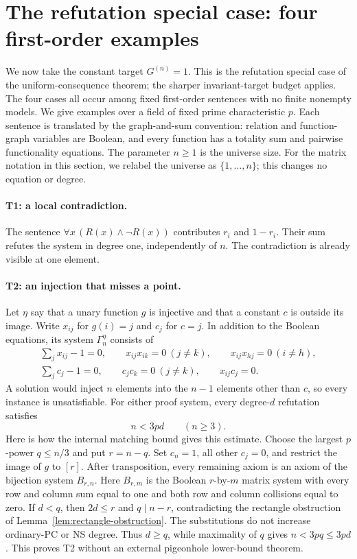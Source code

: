 \section{The refutation special case: four first-order examples}
\label{sec:examples}

We now take the constant target $G^{(n)}=1$. This is the refutation special
case of the uniform-consequence theorem; the sharper invariant-target
budget applies. The four cases all occur among fixed first-order sentences with no finite
nonempty models. We give examples over a field of fixed prime characteristic
$p$. Each sentence is translated by the graph-and-sum convention: relation
and function-graph variables are Boolean, and every function has a totality
sum and pairwise functionality equations. The parameter $n\geq1$ is the
universe size. For the matrix notation in this section, we relabel the
universe as $\{1,\ldots,n\}$; this changes no equation or degree.

\paragraph{T1: a local contradiction.}
The sentence $\forall x\,(R(x)\wedge\neg R(x))$ contributes $r_i$ and
$1-r_i$. Their sum refutes the system in degree one, independently of $n$.
The contradiction is already visible at one element.

\paragraph{T2: an injection that misses a point.}
Let $\eta$ say that a unary function $g$ is injective and that a constant
$c$ is outside its image. Write $x_{ij}$ for $g(i)=j$ and $c_j$ for $c=j$.
In addition to the Boolean equations, its system $\Gamma_n^\eta$ consists of
\begin{equation}\label{eq:G-witness}
\begin{gathered}
 \sum_jx_{ij}-1=0,\qquad
 x_{ij}x_{ik}=0\ (j\ne k),\qquad
 x_{ij}x_{hj}=0\ (i\ne h),\\
 \sum_jc_j-1=0,\qquad
 c_jc_k=0\ (j\ne k),\qquad x_{ij}c_j=0.
\end{gathered}
\end{equation}
A solution would inject $n$ elements into the $n-1$ elements other than $c$,
so every instance is unsatisfiable. For either proof system, every
degree-$d$ refutation satisfies
\[
 n<3pd\qquad(n\geq3).
\]
Here is how the internal matching bound gives this estimate. Choose the
largest $p$-power $q\leq n/3$ and put $r=n-q$. Set $c_n=1$, all other
$c_j=0$, and restrict the image of $g$ to $[r]$. After transposition, every
remaining axiom is an axiom of the bijection system $B_{r,n}$.
Here $B_{r,m}$ is the Boolean $r$-by-$m$ matrix system with every row and
column sum equal to one and both row and column collisions equal to zero.
If $d<q$, then $2d\leq r$ and $q\mid n-r$, contradicting the rectangle
obstruction of Lemma~\ref{lem:rectangle-obstruction}. The substitutions do
not increase ordinary-PC or NS degree. Thus $d\geq q$, while maximality of
$q$ gives $n<3pq\leq3pd$. This proves T2 without an external pigeonhole
lower-bound theorem.

